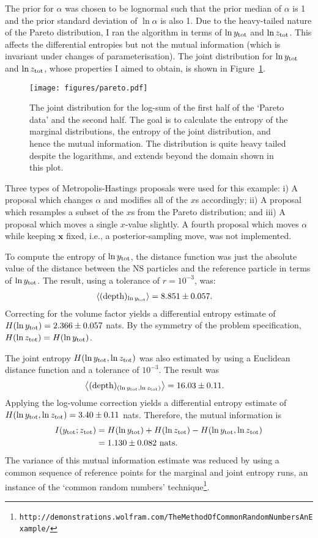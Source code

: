 \documentclass[entropy,article,accept,oneauthor,pdftex,10pt,a4paper]{mdpi}
\newcommand{\depth}{(\textnormal{depth})}
\newcommand{\ytot}{y_{\rm tot}}
\newcommand{\ztot}{z_{\rm tot}}
\begin{document}
The prior for $\alpha$ was chosen to be lognormal such that the prior median
of $\alpha$ is 1 and the prior standard deviation of $\ln \alpha$ is also 1.
Due to the heavy-tailed nature of the Pareto distribution, I ran the
algorithm in terms of $\ln \ytot$ and $\ln \ztot$. This affects the
differential entropies but not the mutual information (which is invariant 
under changes of parameterisation).
The joint distribution
for $\ln \ytot$ and $\ln \ztot$, whose properties I aimed to obtain,
is shown in Figure~\ref{fig:pareto}.

\begin{figure}[!ht]
\centering
\texttt{[image: figures/pareto.pdf]}
\caption{The joint distribution for the log-sum of the first half of the
`Pareto data' and the second half. The goal is to calculate the entropy of
the marginal distributions, the entropy of the joint distribution, and
hence the mutual information. The distribution is quite heavy tailed despite
the logarithms, and extends beyond the domain shown in this plot.
\label{fig:pareto}}
\end{figure}

Three types of Metropolis-Hastings proposals were used for this example:
i) A proposal which changes $\alpha$ and modifies all of the $x$s accordingly;
ii) A proposal which resamples a subset of the $x$s from the Pareto
distribution; and iii) A proposal which moves a single $x$-value slightly.
A fourth proposal which moves $\alpha$ while keeping $\boldsymbol{x}$ fixed,
i.e., a posterior-sampling move, was not implemented.

To compute the entropy of $\ln \ytot$, the distance function was just the
absolute value of the distance between the NS particles and the
reference particle in terms of $\ln \ytot$. The result, using a tolerance
of $r = 10^{-3}$, was:
\begin{align}
\left<\depth_{\ln \ytot}\right> &= 8.851 \pm 0.057.
\end{align}
Correcting for the volume factor yields a differential entropy estimate
of $H(\ln\ytot) = 2.366\pm 0.057$ nats.
By the symmetry of the problem specification, $H(\ln\ztot) = H(\ln\ytot)$.

The joint entropy $H(\ln \ytot, \ln \ztot)$ was also estimated by using
a Euclidean distance function and a tolerance of $10^{-3}$. The result was
\begin{align}
\left<\depth_{(\ln \ytot, \ln \ztot)}\right> &= 16.03 \pm 0.11.
\end{align}
Applying the log-volume correction yields a differential entropy estimate of
$H(\ln \ytot, \ln \ztot) = 3.40 \pm 0.11$ nats.
Therefore, the mutual information is
\begin{align}
I(\ytot; \ztot) &= H(\ln\ytot) + H(\ln\ztot) - H(\ln\ytot, \ln\ztot)\\
                &= 1.130 \pm 0.082 \textnormal{ nats}.
\end{align}
The variance of this mutual information estimate was reduced by
using a common sequence of reference points for the marginal and joint entropy
runs, an instance of the `common random numbers'
technique\footnote{\tt http://demonstrations.wolfram.com/TheMethodOfCommonRandomNumbersAnExample/}.
\end{document}
